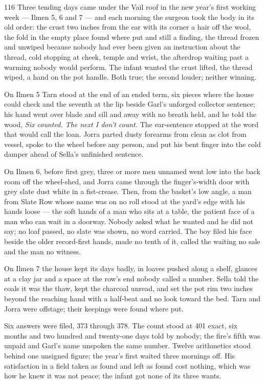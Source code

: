 \begin{CRchronicle}{116}
Three tending days came under the Vail roof in the new year’s first working week — Ilmen 5, 6 and 7 — and each morning the surgeon took the body in its old order: the crust two inches from the ear with its corner a hair off the wool, the fold in the empty place found where put and still a finding, the thread frozen and unwiped because nobody had ever been given an instruction about the thread, cold stopping at cheek, temple and wrist, the afterdrop waiting past a warming nobody would perform. The infant wanted the crust lifted, the thread wiped, a hand on the pot handle. Both true; the second louder; neither winning.

On Ilmen 5 Tarn stood at the end of an ended term, six pieces where the house could check and the seventh at the lip beside Garl’s unforged collector sentence; his hand went over blade and sill and away with no breath held, and he told the wood, \emph{Six counted. The next I don’t count.} The ear-sentence stopped at the word that would call the loan. Jorra parted dusty forearms from clean as clot from vessel, spoke to the wheel before any person, and put his bent finger into the cold damper ahead of Sella’s unfinished sentence.

On Ilmen 6, before first grey, three or more men unnamed went low into the back room off the wheel-shed, and Jorra came through the finger’s-width door with grey slate dust white in a fist-crease. Then, from the basket’s low angle, a man from Slate Row whose name was on no roll stood at the yard’s edge with his hands loose — the soft hands of a man who sits at a table, the patient face of a man who can wait in a doorway. Nobody asked what he wanted and he did not say; no loaf passed, no slate was shown, no word carried. The boy filed his face beside the older record-first hands, made no tenth of it, called the waiting no sale and the man no witness.

On Ilmen 7 the house kept its days badly, in loaves pushed along a shelf, glances at a clay jar and a space at the row’s end nobody called a number. Sella told the coals it was the thaw, kept the charcoal unread, and set the pot rim two inches beyond the reaching hand with a half-beat and no look toward the bed. Tarn and Jorra were offstage; their keepings were found where put.

Six answers were filed, 373 through 378. The count stood at 401 exact, six months and two hundred and twenty-one days told by nobody; the fire’s fifth was unpaid and Garl’s name unspoken the same number. Twelve arithmetics stood behind one unsigned figure; the year’s first waited three mornings off. His satisfaction in a field taken as found and left as found cost nothing, which was how he knew it was not peace; the infant got none of its three wants.
\end{CRchronicle}
